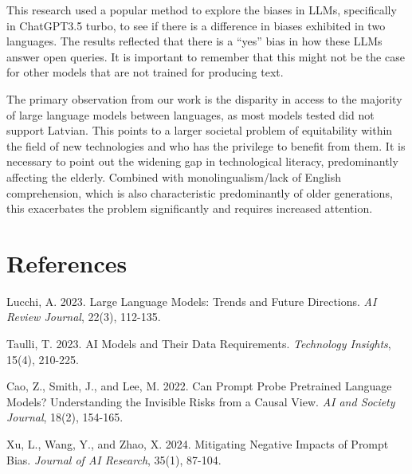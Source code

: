 \documentclass[11pt,twocolumn]{article}
\begin{document}
This research used a popular method to explore the biases in LLMs, specifically in ChatGPT3.5 turbo, to see if there is a difference in biases exhibited in two languages. The results reflected that there is a “yes” bias in how these LLMs answer open queries. It is important to remember that this might not be the case for other models that are not trained for producing text.

The primary observation from our work is the disparity in access to the majority of large language models between languages, as most models tested did not support Latvian. This points to a larger societal problem of equitability within the field of new technologies and who has the privilege to benefit from them. It is necessary to point out the widening gap in technological literacy, predominantly affecting the elderly. Combined with monolingualism/lack of English comprehension, which is also characteristic predominantly of older generations, this exacerbates the problem significantly and requires increased attention.

\section{References}

\begin{thebibliography}{}

Lucchi, A. 2023.
\newblock Large Language Models: Trends and Future Directions.
\newblock \textit{AI Review Journal}, 22(3), 112-135.

Taulli, T. 2023.
\newblock AI Models and Their Data Requirements.
\newblock \textit{Technology Insights}, 15(4), 210-225.

Cao, Z., Smith, J., and Lee, M. 2022.
\newblock Can Prompt Probe Pretrained Language Models? Understanding the Invisible Risks from a Causal View.
\newblock \textit{AI and Society Journal}, 18(2), 154-165.

Xu, L., Wang, Y., and Zhao, X. 2024.
\newblock Mitigating Negative Impacts of Prompt Bias.
\newblock \textit{Journal of AI Research}, 35(1), 87-104.

\end{thebibliography}
\end{document}
